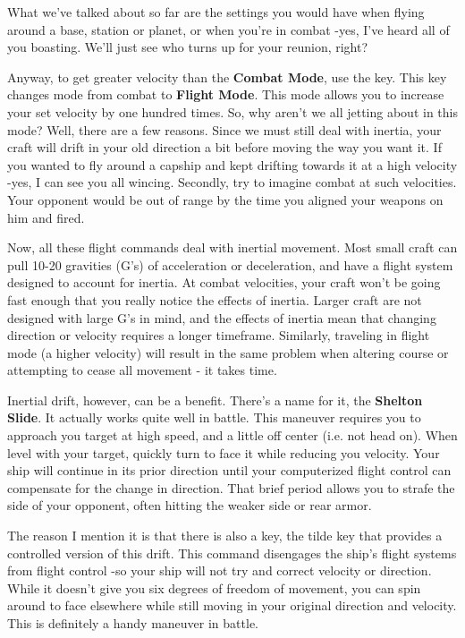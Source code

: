 \documentclass{article}
\newcommand{\key}[1]{%
  \tikz[baseline=(key.base)]{
    \node[draw=gray!50, fill=gray!5, rounded corners=2pt, inner sep=2pt, minimum height=1.5ex] (key) {\footnotesize\sffamily\bfseries #1};
  }%
}
\begin{document}
What we've talked about so far are the settings you would have when flying around a base, station or planet, or when you're in combat -yes, I've heard all of you boasting. We'll just see who turns up for your reunion, right? 

Anyway, to get greater velocity than the \textbf{Combat Mode}, use the \key{y} key. This key changes mode from combat to \textbf{Flight Mode}. This mode allows you to increase your set velocity by one hundred times. So, why aren't we all jetting about in this mode? Well, there are a few reasons. Since we must still deal with inertia, your craft will drift in your old direction a bit before moving the way you want it. If you wanted to fly around a capship and kept drifting towards it at a high velocity -yes, I can see you all wincing. Secondly, try to imagine combat at such velocities. Your opponent would be out of range by the time you aligned your weapons on him and fired. 

Now, all these flight commands deal with inertial movement. Most small craft can pull 10-20 gravities (G's) of acceleration or deceleration, and have a flight system designed to account for inertia. At combat velocities, your craft won't be going fast enough that you really notice the effects of inertia. Larger craft are not designed with large G's in mind, and the effects of inertia mean that changing direction or velocity requires a longer timeframe. Similarly, traveling in flight mode (a higher velocity) will result in the same problem when altering course or attempting to cease all movement - it takes time. 

Inertial drift, however, can be a benefit. There's a name for it, the \textbf{Shelton Slide}. It actually works quite well in battle. This maneuver requires you to approach you target at high speed, and a little off center (i.e. not head on). When level with your target, quickly turn to face it while reducing you velocity. Your ship will continue in its prior direction until your computerized flight control can compensate for the change in direction. That brief period allows you to strafe the side of your opponent, often hitting the weaker side or rear armor. 



The reason I mention it is that there is also a key, the tilde key \key{`} that provides a controlled version of this drift. This command disengages the ship's flight systems from flight control -so your ship will not try and correct velocity or direction. While it doesn't give you six degrees of freedom of movement, you can spin around to face elsewhere while still moving in your original direction and velocity. This is definitely a handy maneuver in battle. 
\end{document}
